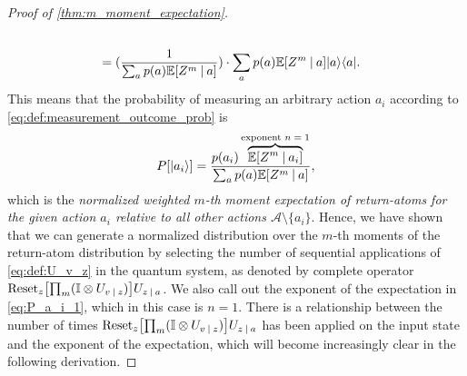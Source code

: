 \documentclass{article}
\DeclarePairedDelimiter{\bra}{\langle}{\rvert} %
\DeclarePairedDelimiter{\ket}{\lvert}{\rangle} %
\DeclarePairedDelimiter{\bparen}{[}{]} %
\newcommand{\E}{\mathbb{E}} %
\newcommand{\bfunc}[2]{#1\bparen*{#2}} %
\newcommand{\given}[1][]{\:#1\vert\:}
\begin{document}
\begin{proof}[Proof of \cref{thm:m_moment_expectation}]
\begin{align}
\\&= (\frac{1}{\sum_{a} p(a) \bfunc{\mathbb{E}}{Z^{m} \given a}}) \cdot \sum_{a} p(a) \bfunc{\mathbb{E}}{Z^{m} \given a} \ket{a}\bra{a}.
\end{align}
% 
This means that the probability of measuring an arbitrary action $a_i$ according to \cref{eq:def:measurement_outcome_prob} is
% 
\begin{equation}\label{eq:P_a_i_1}
\bfunc{P}{\ket{a_i}} = \frac{p(a_i) \overbrace{\bfunc{\mathbb{E}}{Z^{m} \given a_i}}^{\textrm{exponent $n=1$}}}{\sum_{a} p(a) \bfunc{\mathbb{E}}{Z^{m} \given a}},
\end{equation}
% 
which is the \emph{normalized weighted $m$-th moment expectation of return-atoms for the given action $a_i$ relative to all other actions $\mathcal{A} \setminus \{a_i\}$}. 
% 
Hence, we have shown that we can generate a normalized distribution over the $m$-th moments of the return-atom distribution by selecting the number of sequential applications of \cref{eq:def:U_v_z} in the quantum system, as denoted by complete operator $\textrm{Reset}_{z} \bparen*{\prod_{m} (\mathbb{I} \otimes U_{v \given z})} U_{z \given a}$.
% 
We also call out the exponent of the expectation in \cref{eq:P_a_i_1}, which in this case is $n=1$. There is a relationship between the number of times $\textrm{Reset}_{z} \bparen*{\prod_{m} (\mathbb{I} \otimes U_{v \given z})} U_{z \given a}$ has been applied on the input state and the exponent of the expectation, which will become increasingly clear in the following derivation.




\end{proof}
\end{document}
